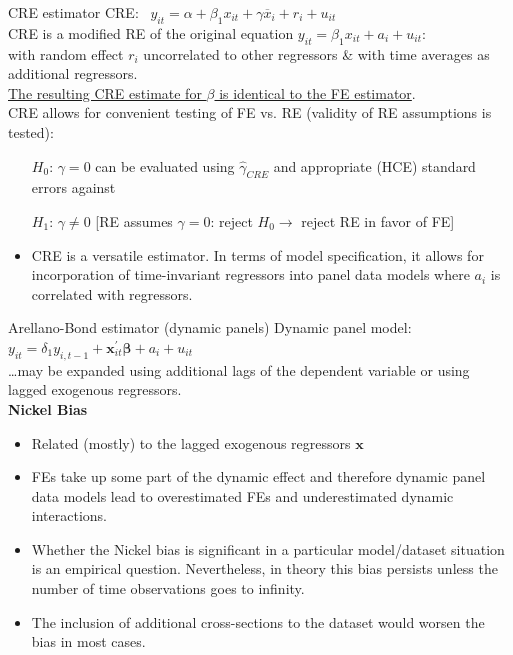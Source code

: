 \documentclass[usenames,dvipsnames]{beamer}
\begin{document}
\begin{frame}{CRE estimator}
CRE: \ $y_{it} = \alpha + \beta_1 x_{it} + \gamma \overline{x}_i + r_i + u_{it}$ \\
\medskip
\small CRE is a modified RE of the original equation $y_{it} =  \beta_1 x_{it} + a_i + u_{it}$: \\
\vspace{0.2cm}
with random effect $r_i$ uncorrelated to other regressors \& with time averages as additional regressors. \\
\vspace{0.3cm}
\underline{The resulting CRE estimate for $\beta$ is identical to the FE estimator}. \\ \medskip
CRE allows for convenient testing of FE vs. RE (validity of RE assumptions is tested):
	\begin{itemize}
	\item[$H_0$:] $\gamma = 0$ can be evaluated using $\hat{\gamma}_{\textit{CRE}}$ and appropriate (HCE) standard errors against
	\item[$H_1$:] $\gamma \neq 0$ [RE assumes $\gamma = 0$: reject $H_0\rightarrow$ reject RE in favor of FE]
	\end{itemize}

\begin{itemize}
    \item CRE is a versatile estimator. In terms of model specification, it allows for incorporation of time-invariant regressors into panel data models where $a_i$ is correlated with regressors.
\end{itemize}
\end{frame}
\begin{frame}{Arellano-Bond estimator (dynamic panels)}
Dynamic panel model:\\
\medskip
$y_{it} = \delta_1 y_{i,t-1} + \bm{x}^{\prime}_{it} \bm{\beta} + a_i + u_{it}$\\
\medskip
\dots may be expanded using additional lags of the dependent variable or using lagged exogenous regressors.\\
\medskip
\small
\textbf{Nickel Bias}
\begin{itemize}
\item Related (mostly) to the lagged exogenous regressors $\bm{x}$
\item FEs take up some part of the dynamic effect and therefore dynamic panel data models lead to overestimated FEs and underestimated dynamic interactions. 
\item Whether the Nickel bias is significant in a particular model/dataset situation is an empirical question. Nevertheless, in theory this bias persists unless the number of time observations goes to infinity.
\item The inclusion of additional cross-sections to the dataset would worsen the bias in most cases.
\end{itemize}
\end{frame}
\end{document}
